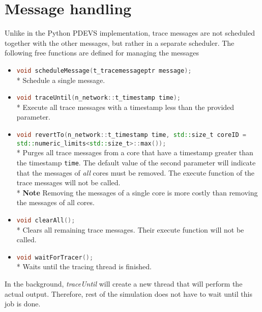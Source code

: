 \documentclass[12pt]{article}
\newcommand{\inlinecpp}[1]{\lstinline[language=c++]{#1}}
\begin{document}
\section{Message handling}
Unlike in the Python PDEVS implementation, trace messages are not scheduled together with the other messages, but rather in a separate scheduler. The following free functions are defined for managing the messages
\begin{itemize}
	\item \inlinecpp{void scheduleMessage(t_tracemessageptr message);}\\*
			Schedule a single message.
	\item \inlinecpp{void traceUntil(n_network::t_timestamp time);}\\*
			Execute all trace messages with a timestamp less than the provided parameter.
	\item \inlinecpp{void revertTo(n_network::t_timestamp time, std::size_t coreID = std::numeric_limits<std::size_t>::max());}\\*
			Purges all trace messages from a core that have a timestamp greater than the timestamp \inlinecpp{time}. The default value of the second parameter will indicate that the messages of \emph{all} cores must be removed. The execute function of the trace messages will not be called.\\*
			\textbf{Note} Removing the messages of a single core is more costly than removing the messages of all cores.
	\item \inlinecpp{void clearAll();}\\*
			Clears all remaining trace messages. Their execute function will not be called.
	\item \inlinecpp{void waitForTracer();}\\*
			Waits until the tracing thread is finished.
\end{itemize}
In the background, \emph{traceUntil} will create a new thread that will perform the actual output. Therefore, rest of the simulation does not have to wait until this job is done.
\end{document}
